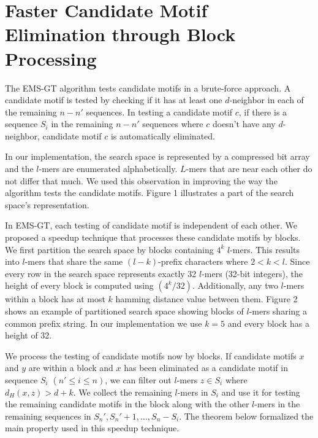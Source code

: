 
\section{Faster Candidate Motif Elimination through Block Processing}

The EMS-GT algorithm tests candidate motifs in a brute-force approach. A candidate motif is tested by checking if it has at least one $d$-neighbor in each of the remaining $n - n'$ sequences. In testing a candidate motif $c$, if there is a sequence $S_i$ in the remaining $n - n'$ sequences where $c$ doesn't have any $d$-neighbor, candidate motif $c$ is automatically eliminated.

In our implementation, the search space is represented by a compressed bit array and the $l$-mers are enumerated alphabetically. $L$-mers that are near each other do not differ that much. We used this observation in improving the way the algorithm tests the candidate motifs. Figure 1 illustrates a part of the search space's representation.



In EMS-GT, each testing of candidate motif is independent of each other. We proposed a speedup technique that processes these candidate motifs by blocks. We first partition the search space by blocks containing $4^k$ $l$-mers. This results into $l$-mers that share the same $(l-k)$-prefix characters where $2 < k < l$. Since every row in the search space represents exactly 32 $l$-mers (32-bit integers), the height of every block is computed using $(4^k / 32)$. Additionally, any two $l$-mers within a block has at most $k$ hamming distance value between them. Figure 2 shows an example of partitioned search space showing blocks of $l$-mers sharing a common prefix string. In our implementation we use $k = 5$ and every block has a height of 32.



We process the testing of candidate motifs now by blocks. If candidate motifs $x$ and $y$ are within a block and $x$ has been eliminated as a candidate motif in sequence $S_i$ $(n' \leq i \leq n)$, we can filter out $l$-mers $z \in S_i$ where $d_H(x,z) > d + k$. We collect the remaining $l$-mers in $S_i$ and use it for testing the remaining candidate motifs in the block along with the other $l$-mers in the remaining sequences in ${S_n', S_n'+1, ..., S_n} - {S_i}$. The theorem below formalized the main property used in this speedup technique.

